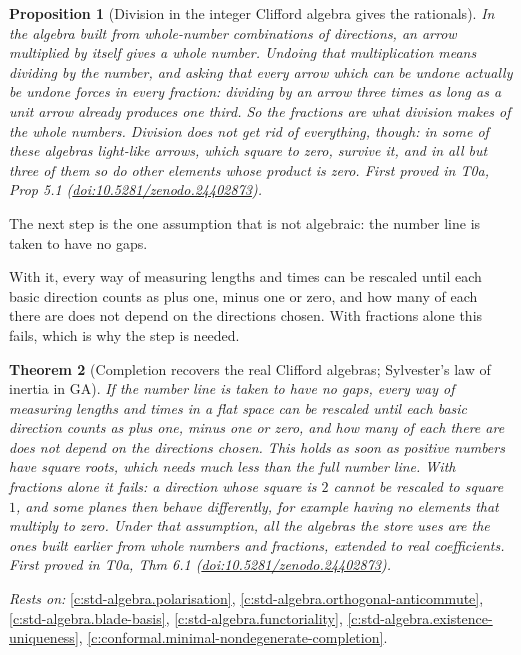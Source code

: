\documentclass[11pt]{article}
\newtheorem{theorem}{Theorem}[section]
\newtheorem{proposition}[theorem]{Proposition}
\theoremstyle{definition}
\theoremstyle{plain}
\begin{document}
\begin{proposition}[Division in the integer Clifford algebra gives the rationals]\label{c:synthesis.division-gives-the-rationals}
In the algebra built from whole-number combinations of directions, an arrow multiplied by itself gives a whole number. Undoing that multiplication means dividing by the number, and asking that every arrow which can be undone actually be undone forces in every fraction: dividing by an arrow three times as long as a unit arrow already produces one third. So the fractions are what division makes of the whole numbers. Division does not get rid of everything, though: in some of these algebras light-like arrows, which square to zero, survive it, and in all but three of them so do other elements whose product is zero.
\emph{First proved in} T0a, Prop 5.1 (\href{https://doi.org/10.5281/zenodo.24402873}{doi:10.5281/zenodo.24402873}).
\end{proposition}

The next step is the one assumption that is not algebraic: the number line is taken to have no gaps.

With it, every way of measuring lengths and times can be rescaled until each basic direction counts as plus one, minus one or zero, and how many of each there are does not depend on the directions chosen. With fractions alone this fails, which is why the step is needed.

\begin{theorem}[Completion recovers the real Clifford algebras; Sylvester's law of inertia in GA]\label{c:synthesis.completion-recovers-the-real-clifford-algebras}
If the number line is taken to have no gaps, every way of measuring lengths and times in a flat space can be rescaled until each basic direction counts as plus one, minus one or zero, and how many of each there are does not depend on the directions chosen. This holds as soon as positive numbers have square roots, which needs much less than the full number line. With fractions alone it fails: a direction whose square is $2$ cannot be rescaled to square $1$, and some planes then behave differently, for example having no elements that multiply to zero. Under that assumption, all the algebras the store uses are the ones built earlier from whole numbers and fractions, extended to real coefficients.
\emph{First proved in} T0a, Thm 6.1 (\href{https://doi.org/10.5281/zenodo.24402873}{doi:10.5281/zenodo.24402873}).
\end{theorem}
\noindent\emph{Rests on:} \ref{c:std-algebra.polarisation}, \ref{c:std-algebra.orthogonal-anticommute}, \ref{c:std-algebra.blade-basis}, \ref{c:std-algebra.functoriality}, \ref{c:std-algebra.existence-uniqueness}, \ref{c:conformal.minimal-nondegenerate-completion}.
\end{document}
